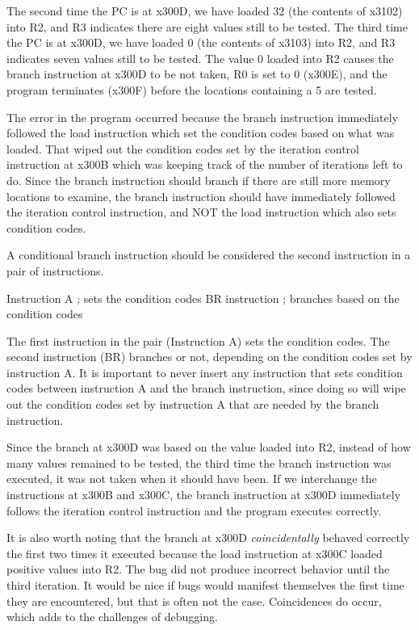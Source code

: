 \documentclass{patt}
\begin{document}
The second time the PC is at x300D, we have loaded 32 (the contents of
x3102) into R2, and R3 indicates there are eight values still to be
tested.  The third time the PC is at x300D, we have loaded 0 (the
contents of x3103) into R2, and R3 indicates seven values still
to be tested.  The value 0 loaded into R2 causes the branch instruction 
at x300D to be not taken, R0 is set to 0 (x300E), and the program 
terminates (x300F) before the locations containing a 5 are tested.

The error in the program occurred because the branch instruction immediately
followed the load instruction which set the condition codes based on what
was loaded.  That wiped out the condition codes set by the iteration control 
instruction at x300B which was keeping track of the number of iterations left 
to do.  Since the branch instruction should branch if there are still more
memory locations to examine, the branch instruction should have immediately 
followed the iteration control instruction, and NOT the load instruction 
which also sets condition codes.  

A conditional branch instruction should be considered the second instruction
in a pair of instructions. 

\begin{colorverbatim}
     Instruction A  ; sets the condition codes
     BR instruction ; branches based on the condition codes
\end{colorverbatim}

The first instruction in the pair (Instruction A) sets the condition codes.  
The second instruction (BR) branches or not, depending on the condition codes 
set by instruction A.  It is important to never insert any instruction that
sets condition codes between instruction A and the branch instruction, since
doing so will wipe out the condition codes set by instruction A that are 
needed by the branch instruction.

Since the branch at x300D was based
on the value loaded into R2, instead of how many values 
remained to be tested, the third time the branch instruction was executed,
it was not taken when it should have been.
If we interchange the instructions at x300B and x300C, the branch
instruction at x300D immediately follows the iteration control 
instruction and the program executes correctly.

It is also worth noting that the branch at x300D {\em coincidentally} behaved 
correctly the first two times it executed because the load instruction at
x300C loaded positive values into R2.  The bug did not produce incorrect
behavior until the third iteration.  It would be nice if bugs would 
manifest themselves the first time they are encountered, but that is often 
not the case.  Coincidences do occur, which adds to the challenges of
debugging.
\end{document}
